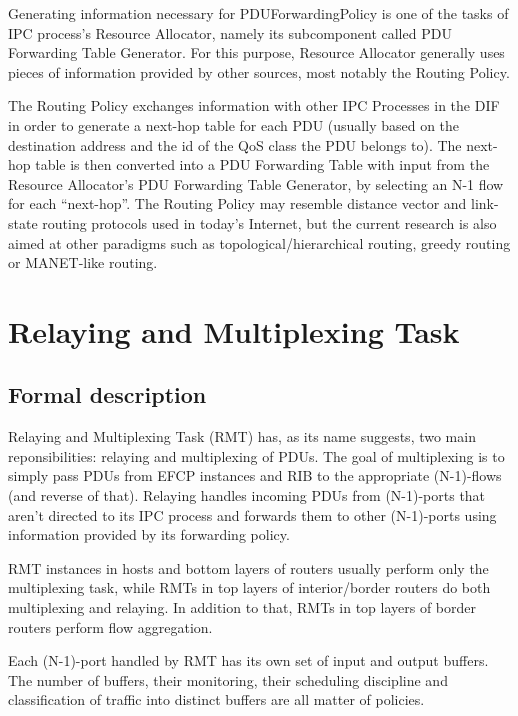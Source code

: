         Generating information necessary for PDUForwardingPolicy is one of the tasks of IPC process's Resource Allocator, namely its subcomponent called PDU Forwarding Table Generator. For this purpose, Resource Allocator generally uses pieces of information provided by other sources, most notably the Routing Policy.

        The Routing Policy exchanges information with other IPC Processes in the DIF in order to generate a next-hop table for each PDU (usually based on the destination address and the id of the QoS class the PDU belongs to). The next-hop table is then converted into a PDU Forwarding Table with input from the Resource Allocator's PDU Forwarding Table Generator, by selecting an N-1 flow for each ``next-hop''. The Routing Policy may resemble distance vector and link-state routing protocols used in today's Internet, but the current research is also aimed at other paradigms such as topological/hierarchical routing, greedy routing or MANET-like routing.

    \section{Relaying and Multiplexing Task}

        \subsection{Formal description}

            Relaying and Multiplexing Task (RMT) has, as its name suggests, two main reponsibilities: relaying and multiplexing of PDUs. The goal of multiplexing is to simply pass PDUs from EFCP instances and RIB to the appropriate (N-1)-flows (and reverse of that). Relaying handles incoming PDUs from (N-1)-ports that aren't directed to its IPC process and forwards them to other (N-1)-ports using information provided by its forwarding policy.

            \vspace{300pt}

            RMT instances in hosts and bottom layers of routers usually perform only the multiplexing task, while RMTs in top layers of interior/border routers do both multiplexing and relaying. In addition to that, RMTs in top layers of border routers perform flow aggregation.

            \vspace{300pt}

            Each (N-1)-port handled by RMT has its own set of input and output buffers. The number of buffers, their monitoring, their scheduling discipline and classification of traffic into distinct buffers are all matter of policies.

